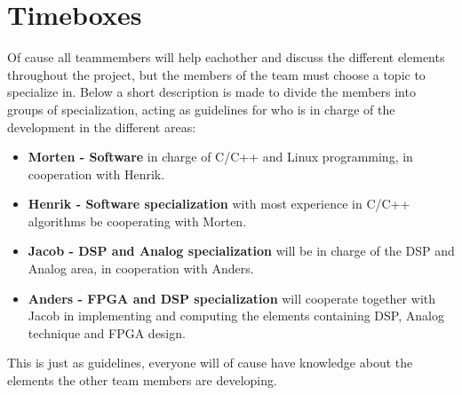\documentclass[12pt,a4paper]{report}
\begin{document}
\chapter{Timeboxes}
Of cause all teammembers will help eachother and discuss the different elements throughout the project, but the members of the team must choose a topic to specialize in. Below a short description is made to divide the members into groups of specialization, acting as guidelines for who is in charge of the development in the different areas:
\begin{itemize}
\item \textbf{Morten - Software} in charge of C/C++ and Linux programming, in cooperation with Henrik.
\item \textbf{Henrik - Software specialization} with most experience in C/C++ algorithms be cooperating with Morten.
\item \textbf{Jacob - DSP and Analog specialization} will be in charge of the DSP and Analog area, in cooperation with Anders.
\item \textbf{Anders - FPGA and DSP specialization} will cooperate together with Jacob in implementing and computing the elements containing DSP, Analog technique and FPGA design.
\end{itemize}
This is just as guidelines, everyone will of cause have knowledge about the elements the other team members are developing.








\end{document}
